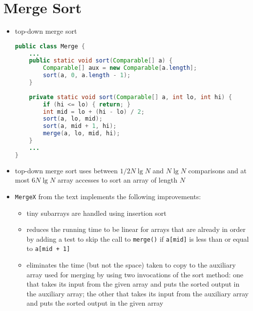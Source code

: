 \documentclass[8pt,a4paper,compress]{beamer}
\begin{document}
\section{Merge Sort}
\begin{frame}[fragile]
\begin{itemize}
\item top-down merge sort
\begin{lstlisting}[language=Java]
public class Merge {
    ...
    public static void sort(Comparable[] a) {
        Comparable[] aux = new Comparable[a.length]; 
        sort(a, 0, a.length - 1);
    }
    
    private static void sort(Comparable[] a, int lo, int hi) {
        if (hi <= lo) { return; }
        int mid = lo + (hi - lo) / 2;
        sort(a, lo, mid); 
        sort(a, mid + 1, hi); 
        merge(a, lo, mid, hi);
    }
    ...
}
\end{lstlisting}
\end{itemize}
\end{frame}

\begin{frame}[fragile]
\begin{itemize}
\item trace
\begin{center}
\texttt{[image: \{./figures/mergetd\_trace]}.pdf}

\smallskip

top-down merge sort
\end{center}
\end{itemize}
\end{frame}

\begin{frame}[fragile]
\begin{itemize}
\item top-down merge sort uses between $1/2N\lg N$ and $N\lg N$ comparisons and at most $6N\lg N$ array accesses to sort an array of length $N$

\item \lstinline$MergeX$ from the text implements the following improvements:

\begin{itemize}
\item tiny subarrays are handled using insertion sort

\item reduces the running time to be linear for arrays that are already in order by adding a test to skip the call to \lstinline$merge()$ if \lstinline$a[mid]$ is less than or equal to \lstinline$a[mid + 1]$

\item eliminates the time (but not the space) taken to copy to the auxiliary array used for merging by using two invocations of the sort method: one that takes its input from the given array and puts the sorted output in the auxiliary array; the other that takes its input from the auxiliary array and puts the sorted output in the given array
\end{itemize}
\end{itemize}
\end{frame}
\end{document}
